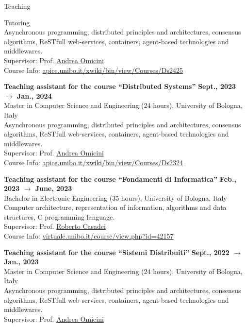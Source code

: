 \documentclass{resume} %
\begin{document}
\begin{rSection}{Teaching}
\begin{rSubsection2}{Tutoring}
            \\Asynchronous programming, distributed principles and architectures, consensus algorithms, ReSTfull web-services, containers, agent-based technologies and middlewares.
            \\Supervisor: Prof. \href{mailto:andrea.omicini@unibo.it}{Andrea Omicini}
            \\Course Info: \url{apice.unibo.it/xwiki/bin/view/Courses/Ds2425}
            \item\textbf{ Teaching assistant for the course ``Distributed Systems'' }\hfill \textbf{Sept., 2023 $\rightarrow$ Jan., 2024}
            \\Master in Computer Science and Engineering (24 hours), University of Bologna, Italy
            \\Asynchronous programming, distributed principles and architectures, consensus algorithms, ReSTfull web-services, containers, agent-based technologies and middlewares.
            \\Supervisor: Prof. \href{mailto:andrea.omicini@unibo.it}{Andrea Omicini}
            \\Course Info: \url{apice.unibo.it/xwiki/bin/view/Courses/Ds2324}
            \item\textbf{ Teaching assistant for the course ``Fondamenti di Informatica'' }\hfill \textbf{Feb., 2023 $\rightarrow$ June, 2023}
            \\Bachelor in Electronic Engineering (35 hours), University of Bologna, Italy
            \\Computer architecture, representation of information, algorithms and data structures, C programming language.
            \\Supervisor: Prof. \href{mailto:roberto.casadei@unibo.it}{Roberto Casadei}
            \\Course Info: \url{virtuale.unibo.it/course/view.php?id=42157}
            \item\textbf{ Teaching assistant for the course ``Sistemi Distribuiti'' }\hfill \textbf{Sept., 2022 $\rightarrow$ Jan., 2023}
            \\Master in Computer Science and Engineering (24 hours), University of Bologna, Italy
            \\Asynchronous programming, distributed principles and architectures, consensus algorithms, ReSTfull web-services, containers, agent-based technologies and middlewares.
            \\Supervisor: Prof. \href{mailto:andrea.omicini@unibo.it}{Andrea Omicini}

\end{rSubsection2}
\end{rSection}
\end{document}
